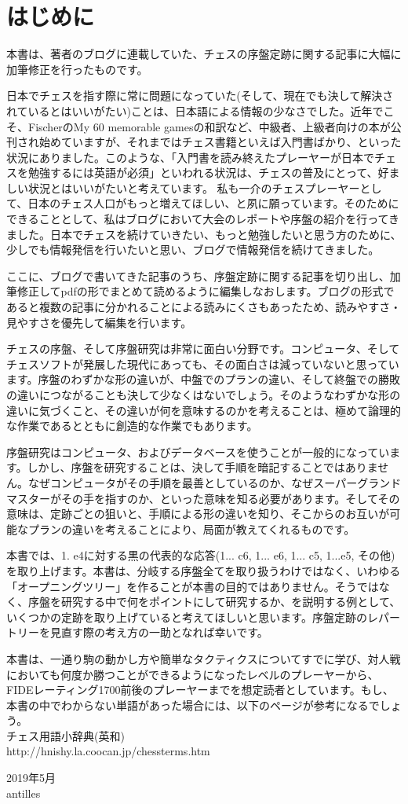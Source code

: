 \section*{はじめに}

本書は、著者のブログに連載していた、チェスの序盤定跡に関する記事に大幅に加筆修正を行ったものです。

日本でチェスを指す際に常に問題になっていた(そして、現在でも決して解決されているとはいいがたい)ことは、日本語による情報の少なさでした。近年でこそ、FischerのMy 60 memorable gamesの和訳など、中級者、上級者向けの本が公刊され始めていますが、それまではチェス書籍といえば入門書ばかり、といった状況にありました。このような、「入門書を読み終えたプレーヤーが日本でチェスを勉強するには英語が必須」といわれる状況は、チェスの普及にとって、好ましい状況とはいいがたいと考えています。
私も一介のチェスプレーヤーとして、日本のチェス人口がもっと増えてほしい、と夙に願っています。そのためにできることとして、私はブログにおいて大会のレポートや序盤の紹介を行ってきました。日本でチェスを続けていきたい、もっと勉強したいと思う方のために、少しでも情報発信を行いたいと思い、ブログで情報発信を続けてきました。

ここに、ブログで書いてきた記事のうち、序盤定跡に関する記事を切り出し、加筆修正してpdfの形でまとめて読めるように編集しなおします。ブログの形式であると複数の記事に分かれることによる読みにくさもあったため、読みやすさ・見やすさを優先して編集を行います。

チェスの序盤、そして序盤研究は非常に面白い分野です。コンピュータ、そしてチェスソフトが発展した現代にあっても、その面白さは減っていないと思っています。序盤のわずかな形の違いが、中盤でのプランの違い、そして終盤での勝敗の違いにつながることも決して少なくはないでしょう。そのようなわずかな形の違いに気づくこと、その違いが何を意味するのかを考えることは、極めて論理的な作業であるとともに創造的な作業でもあります。

序盤研究はコンピュータ、およびデータベースを使うことが一般的になっています。しかし、序盤を研究することは、決して手順を暗記することではありません。なぜコンピュータがその手順を最善としているのか、なぜスーパーグランドマスターがその手を指すのか、といった意味を知る必要があります。そしてその意味は、定跡ごとの狙いと、手順による形の違いを知り、そこからのお互いが可能なプランの違いを考えることにより、局面が教えてくれるものです。

本書では、1. e4に対する黒の代表的な応答(1... c6, 1... e6, 1... c5, 1...e5, その他)を取り上げます。本書は、分岐する序盤全てを取り扱うわけではなく、いわゆる「オープニングツリー」を作ることが本書の目的ではありません。そうではなく、序盤を研究する中で何をポイントにして研究するか、を説明する例として、いくつかの定跡を取り上げていると考えてほしいと思います。序盤定跡のレパートリーを見直す際の考え方の一助となれば幸いです。

本書は、一通り駒の動かし方や簡単なタクティクスについてすでに学び、対人戦においても何度か勝つことができるようになったレベルのプレーヤーから、FIDEレーティング1700前後のプレーヤーまでを想定読者としています。もし、本書の中でわからない単語があった場合には、以下のページが参考になるでしょう。\\
チェス用語小辞典(英和)\\
http://hnishy.la.coocan.jp/chessterms.htm


\begin{flushright}
2019年5月\\
antilles
\end{flushright}
